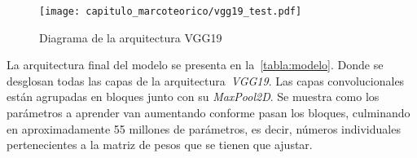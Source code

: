 \begin{landscape}
    \vspace*{3cm}
    \begin{figure}[H]
        \centering
        \texttt{[image: capitulo\_marcoteorico/vgg19\_test.pdf]}
        \caption{Diagrama de la arquitectura VGG19}\label{fig:vgg_diagram}
    \end{figure}
\end{landscape}



La arquitectura final del modelo se presenta en la~\autoref{tabla:modelo}. Donde
se desglosan todas las capas de la arquitectura~\emph{VGG19}. Las capas
convolucionales están agrupadas en bloques junto con su \emph{MaxPool2D}. Se
muestra como los parámetros a aprender van aumentando conforme pasan los
bloques, culminando en aproximadamente 55 millones de parámetros, es decir,
números individuales pertenecientes a la matriz de pesos que se tienen que
ajustar.

